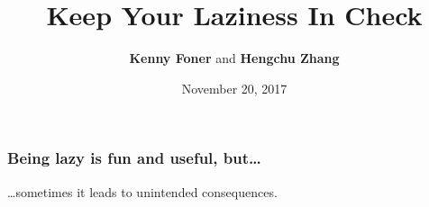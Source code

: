 \documentclass{beamer}
\title{Keep Your Laziness In Check}
\author{\textbf{Kenny Foner} and \textbf{Hengchu Zhang}}
\institute{University of Pennsylvania}
\date{November 20, 2017}
\begin{document}
\frame{\titlepage}

\begin{frame}
\frametitle{Being lazy is fun and useful, but\dots}
\Large\dots sometimes it leads to unintended consequences.
\end{frame}

\end{document}
